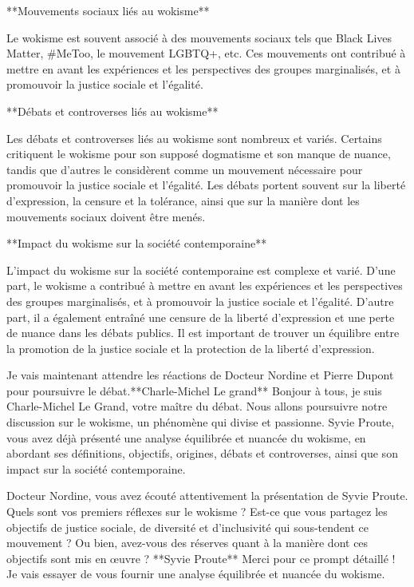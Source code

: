 **Mouvements sociaux liés au wokisme**

Le wokisme est souvent associé à des mouvements sociaux tels que Black Lives Matter, #MeToo, le mouvement LGBTQ+, etc. Ces mouvements ont contribué à mettre en avant les expériences et les perspectives des groupes marginalisés, et à promouvoir la justice sociale et l'égalité.

**Débats et controverses liés au wokisme**

Les débats et controverses liés au wokisme sont nombreux et variés. Certains critiquent le wokisme pour son supposé dogmatisme et son manque de nuance, tandis que d'autres le considèrent comme un mouvement nécessaire pour promouvoir la justice sociale et l'égalité. Les débats portent souvent sur la liberté d'expression, la censure et la tolérance, ainsi que sur la manière dont les mouvements sociaux doivent être menés.

**Impact du wokisme sur la société contemporaine**

L'impact du wokisme sur la société contemporaine est complexe et varié. D'une part, le wokisme a contribué à mettre en avant les expériences et les perspectives des groupes marginalisés, et à promouvoir la justice sociale et l'égalité. D'autre part, il a également entraîné une censure de la liberté d'expression et une perte de nuance dans les débats publics. Il est important de trouver un équilibre entre la promotion de la justice sociale et la protection de la liberté d'expression.

Je vais maintenant attendre les réactions de Docteur Nordine et Pierre Dupont pour poursuivre le débat.**Charle-Michel Le grand**
Bonjour à tous, je suis Charle-Michel Le Grand, votre maître du débat. Nous allons poursuivre notre discussion sur le wokisme, un phénomène qui divise et passionne. Syvie Proute, vous avez déjà présenté une analyse équilibrée et nuancée du wokisme, en abordant ses définitions, objectifs, origines, débats et controverses, ainsi que son impact sur la société contemporaine.

Docteur Nordine, vous avez écouté attentivement la présentation de Syvie Proute. Quels sont vos premiers réflexes sur le wokisme ? Est-ce que vous partagez les objectifs de justice sociale, de diversité et d'inclusivité qui sous-tendent ce mouvement ? Ou bien, avez-vous des réserves quant à la manière dont ces objectifs sont mis en œuvre ?
**Syvie Proute**
Merci pour ce prompt détaillé ! Je vais essayer de vous fournir une analyse équilibrée et nuancée du wokisme.

